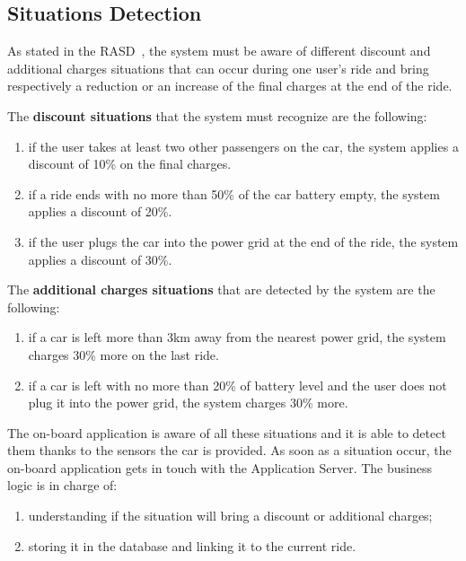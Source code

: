 \subsection{Situations Detection}
As stated in the RASD~\cite{rasd}, the system must be aware of different discount and additional charges situations that can occur during one user's ride and bring respectively a reduction or an increase of the final charges at the end of the ride.

The \textbf{discount situations} that the system must recognize are the following:
\begin{enumerate}
\item if the user takes at least two other passengers on the car, the system applies a discount of 10\% on the final charges.
\item if a ride ends with no more than 50\% of the car battery empty, the system applies a discount of 20\%.
\item if the user plugs the car into the power grid at the end of the ride, the system applies a discount of 30\%.
\end{enumerate}

\noindent
The \textbf{additional charges situations} that are detected by the system are the following:
\begin{enumerate}
\item if a car is left more than 3km away from the nearest power grid, the system charges 30\% more on the last ride.
\item if a car is left with no more than 20\% of battery level and the user does not plug it into the power grid, the system charges 30\% more.
\end{enumerate}

\noindent
The on-board application is aware of all these situations and it is able to detect them thanks to the sensors the car is provided.
As soon as a situation occur, the on-board application gets in touch with the Application Server. The business logic is in charge of:
\begin{enumerate}
\item understanding if the situation will bring a discount or additional charges;
\item storing it in the database and linking it to the current ride.
\end{enumerate}

